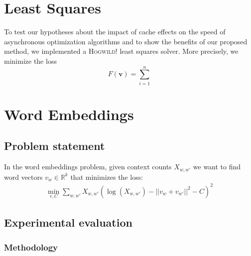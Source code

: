 \documentclass[times,11pt]{article}
\numberwithin{equation}{section}		%
\numberwithin{figure}{section}			%
\numberwithin{table}{section}				%
\newcommand{\ltwonorm}[1]{\left|\left|{#1}\right|\right|}
\newcommand{\xvec}{\mathbf{v}}
\newcommand{\HW}{\textsc{Hogwild!}}
\begin{document}
\section{Least Squares}\label{sec:ls}

To test our hypotheses about the impact of cache effects on the speed of asynchronous optimization algorithms and to show the benefits of our proposed method, we implemented a \HW{} least squares solver. More precisely, we minimize the loss 
\begin{equation}
F(\xvec) = \sum_{i = 1}^n 
\end{equation}
















\section{Word Embeddings}\label{sec:w2v}

\subsection{Problem statement}
In the word embeddings problem, given context counts $X_{w,w'}$ we want to find word vectors
$v_{w} \in \mathbb{R}^{k}$ that minimizes the loss:
\begin{align*}
\min_{v,C}\sum_{w,w'}X_{w,w'} \left(\log(X_{w,w'}) - \ltwonorm{v_w+v_{w'}}^2 - C\right)^2
\end{align*}

\subsection{Experimental evaluation}
\subsubsection{Methodology}
\end{document}
